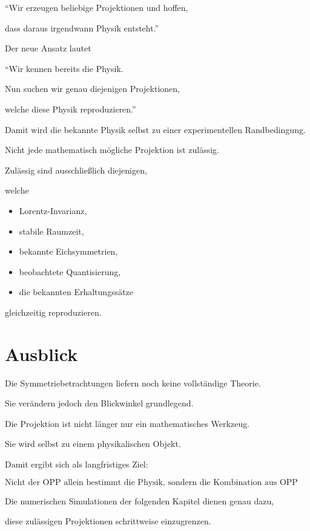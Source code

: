 \begin{center}

``Wir erzeugen beliebige Projektionen und hoffen,

dass daraus irgendwann Physik entsteht.''

\end{center}

Der neue Ansatz lautet

\begin{center}

``Wir kennen bereits die Physik.

Nun suchen wir genau diejenigen Projektionen,

welche diese Physik reproduzieren.''

\end{center}

Damit wird die bekannte Physik selbst zu einer experimentellen Randbedingung.

Nicht jede mathematisch mögliche Projektion ist zulässig.

Zulässig sind ausschließlich diejenigen,

welche

\begin{itemize}

\item Lorentz-Invarianz,

\item stabile Raumzeit,

\item bekannte Eichsymmetrien,

\item beobachtete Quantisierung,

\item die bekannten Erhaltungssätze

\end{itemize}

gleichzeitig reproduzieren.

\section*{Ausblick}

Die Symmetriebetrachtungen liefern noch keine vollständige Theorie.

Sie verändern jedoch den Blickwinkel grundlegend.

Die Projektion ist nicht länger nur ein mathematisches Werkzeug.

Sie wird selbst zu einem physikalischen Objekt.

Damit ergibt sich als langfristiges Ziel:

\[
\boxed{
\text{Nicht der OPP allein bestimmt die Physik,
sondern die Kombination aus OPP und zulässiger Projektion.}
}
\]

Die numerischen Simulationen der folgenden Kapitel dienen genau dazu,

diese zulässigen Projektionen schrittweise einzugrenzen.

